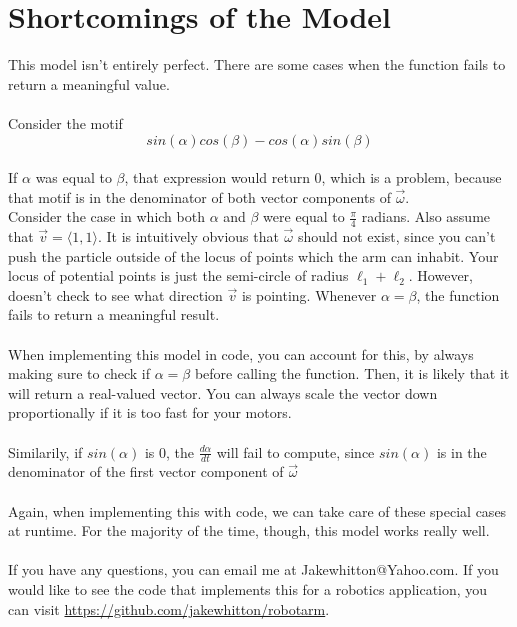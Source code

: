 \documentclass{article}
\begin{document}
\section{Shortcomings of the Model}
This model isn't entirely perfect.  There are some cases when the function fails to return a meaningful value.
\\
\\
Consider the motif
\begin{equation*}
sin(\alpha)cos(\beta) -cos(\alpha)sin(\beta)
\end{equation*}
\\
If $\alpha$ was equal to $\beta$, that expression would return 0, which is a problem, because that motif is in the denominator of both vector components of $\vec{\omega}$.
\\
Consider the case in which both $\alpha$ and $\beta$ were equal to $\frac{\pi}{4}$ radians.  Also assume that $\vec{v} = \langle1,1\rangle$.  It is intuitively obvious that $\vec{\omega}$ should not exist, since you can't push the particle outside of the locus of points which the arm can inhabit.  Your locus of potential points is just the semi-circle of radius $\ell_1 + \ell_2$.  However, doesn't check to see what direction $\vec{v}$ is pointing.  Whenever $\alpha = \beta$, the function fails to return a meaningful result.
\\
\\
When implementing this model in code, you can account for this, by always making sure to check if $\alpha = \beta$ before calling the function.  Then, it is likely that it will return a real-valued vector.  You can always scale the vector down proportionally if it is too fast for your motors.
\\
\\
Similarily, if $sin(\alpha)$ is 0, the $\frac{d\alpha}{dt}$ will fail to compute, since $sin(\alpha)$ is in the denominator of the first vector component of $\vec{\omega}$
\\
\\
Again, when implementing this with code, we can take care of these special cases at runtime.  For the majority of the time, though, this model works really well.
\\
\\
If you have any questions, you can email me at Jakewhitton@Yahoo.com.  If you would like to see the code that implements this for a robotics application, you can visit \url{https://github.com/jakewhitton/robotarm}.
\end{document}
